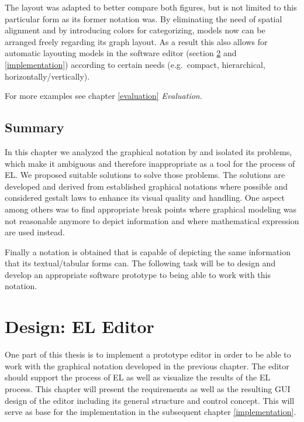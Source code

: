 \documentclass[twoside, openright, 12pt]{book}
\begin{document}
The layout was adapted to better compare both figures, but is not limited to this particular form as its former notation was.
By eliminating the need of spatial alignment and by introducing colors for categorizing, models now can be arranged freely regarding its graph layout.
As a result this also allows for automatic layouting models in the software editor (section \ref{editor_design} and \ref{implementation}) according to certain needs (e.g.~compact, hierarchical, horizontally/vertically).

For more examples see chapter \ref{evaluation} \textit{Evaluation}.




\section{Summary}
\label{gsl_summary}
In this chapter we analyzed the graphical notation by \cite{Amthor18} and isolated its problems, which make it ambiguous and therefore inappropriate as a tool for the process of EL.
We proposed suitable solutions to solve those problems.
The solutions are developed and derived from established graphical notations where possible and considered gestalt laws to enhance its visual quality and handling.
One aspect among others was to find appropriate break points where graphical modeling was not reasonable anymore to depict information and where mathematical expression are used instead.

Finally a notation is obtained that is capable of depicting the same information that its textual/tabular forms can.
The following task will be to design and develop an appropriate software prototype to being able to work with this notation.





\cleardoublepage
\chapter{Design: EL Editor}
\label{editor_design}
One part of this thesis is to implement a prototype editor in order to be able to work with the graphical notation developed in the previous chapter.
The editor should support the process of EL as well as visualize the results of the EL process.
This chapter will present the requirements as well as the resulting GUI design of the editor including its general structure and control concept.
This will serve as base for the implementation in the subsequent chapter \ref{implementation}.
\end{document}
